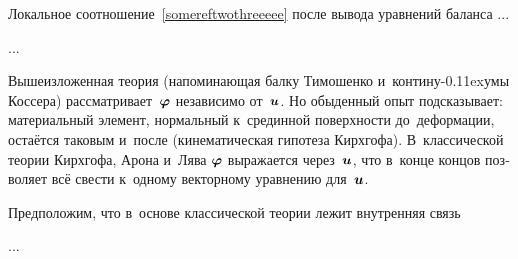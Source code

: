 

\begin{otherlanguage}{russian}

Локальное соотношение~\eqref{somereftwothreeeee} после вывода уравнений баланса ...

...



\end{otherlanguage}



\begin{otherlanguage}{russian}

Вышеизложенная теория (напоминающая балку Тимошенко и~контину\kern-0.11exумы Коссера) рассматривает~$\bm{\varphi}$ независимо от~$\bm{u}$. Но обыденный опыт подсказывает: материальный элемент, нормальный к~срединной поверхности до~деформации, остаётся таковым и~после (кинематическая гипотеза Кирхгофа). В~классической теории Кирхгофа, Арона и~Лява $\bm{\varphi}$ выражается через~$\bm{u}$, что в~конце концов позволяет всё свести к~одному векторному уравнению для~$\bm{u}$.

Предположим, что в~основе классической теории лежит внутренняя связь

...



\end{otherlanguage}


